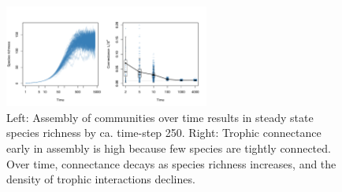 \documentclass[twocolumn,preprintnumbers,amsmath,amssymb,superscriptaddress,linenumbers]{revtex4-1}
\newcommand{\rr}[1]{{\rm #1}}
\begin{document}
% 

% 



\begin{figure}[h!]
\centering
\includegraphics[width=0.6\textwidth]{fig_conn.pdf}
\caption{
Left: Assembly of communities over time results in steady state species richness by ca. time-step 250.
Right: Trophic connectance early in assembly is high because few species are tightly connected.
Over time, connectance decays as species richness increases, and the density of trophic interactions declines.
}
\label{fig:conn}
\end{figure}
\end{document}
